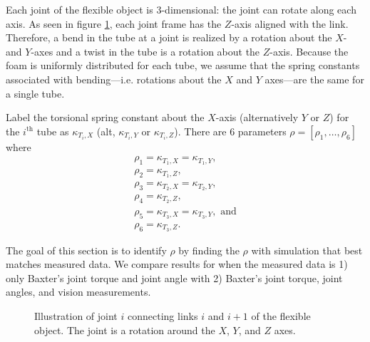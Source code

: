 \documentclass[runningheads,a4paper]{llncs}
\begin{document}
Each joint of the flexible object is 3-dimensional: the joint can rotate along each axis. As seen in figure \ref{fig-tube_link}, each joint frame has the $Z$-axis aligned with the link. Therefore, a bend in the tube at a joint is realized by a rotation about the $X$- and $Y$-axes and a twist in the tube is a rotation about the $Z$-axis. Because the foam is uniformly distributed for each tube, we assume that the spring constants associated with bending---i.e. rotations about the $X$ and $Y$ axes---are the same for a single tube. 

Label the torsional spring constant about the $X$-axis (alternatively $Y$ or $Z$) for the $i^{\textrm{th}}$ tube as $\kappa_{T_i,X}$ (alt, $\kappa_{T_i,Y}$ or $\kappa_{T_i,Z}$). There are 6 parameters $\rho = [\rho_1,\ldots,\rho_6]$ where 
\begin{equation}
\begin{array}{l}
\rho_1 = \kappa_{T_1,X} = \kappa_{T_1,Y}, \\
\rho_2 = \kappa_{T_1,Z}, \\
\rho_3 = \kappa_{T_2,X} = \kappa_{T_2,Y}, \\
\rho_4 = \kappa_{T_2,Z} , \\
\rho_5 = \kappa_{T_3,X} = \kappa_{T_3,Y}, \textrm{ and} \\
\rho_6 = \kappa_{T_3,Z}. 
\end{array}
\label{eq-params}
\end{equation}

The goal of this section is to identify $\rho$ by finding the $\rho$ with simulation that best matches measured data.  We compare results for when the measured data is 1) only Baxter's joint torque and joint angle with 2) Baxter's joint torque, joint angles, and vision measurements.

\begin{figure}[!htb]
\centering
\def\svgwidth{.80\textwidth}%

\caption{Illustration of joint $i$ connecting links $i$ and $i+1$ of the flexible object.  The joint is a rotation around the $X$, $Y$, and $Z$ axes.}
\label{fig-tube_link}
\end{figure}
\end{document}
